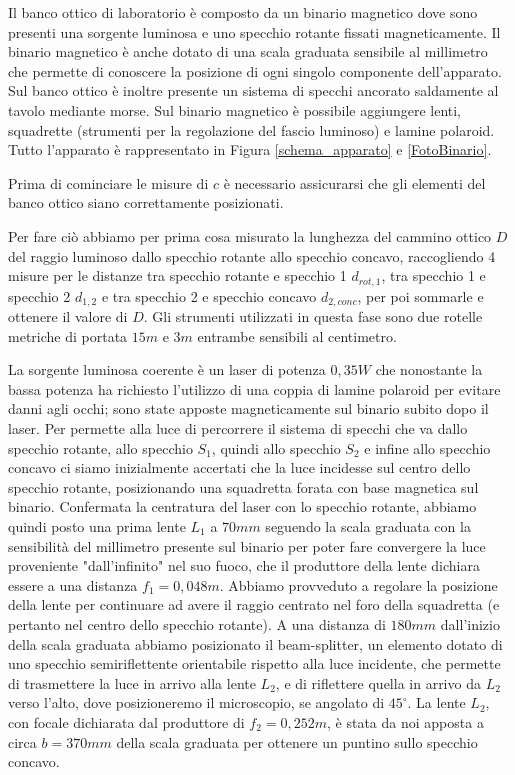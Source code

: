 \documentclass{article}
\begin{document}
Il banco ottico di laboratorio è composto da un binario magnetico dove sono presenti una sorgente luminosa e uno specchio rotante fissati magneticamente. Il binario magnetico
è anche dotato di una scala graduata sensibile al millimetro che permette di conoscere la posizione di ogni singolo componente dell'apparato. Sul banco ottico è inoltre 
presente un sistema di specchi ancorato saldamente al tavolo mediante morse. Sul binario magnetico è possibile aggiungere lenti, squadrette (strumenti per la 
regolazione del fascio luminoso) e lamine polaroid. Tutto l'apparato è rappresentato in Figura \ref{schema_apparato} e \ref{FotoBinario}.

Prima di cominciare le misure di $c$ è necessario assicurarsi che gli elementi del banco ottico siano correttamente posizionati.

\vspace{3mm}

Per fare ciò abbiamo per prima cosa misurato la lunghezza del cammino ottico $D$ del raggio luminoso dallo specchio rotante allo specchio concavo, raccogliendo 
4 misure per le distanze tra specchio rotante e specchio 1 $d_{rot,1}$, tra specchio 1 e specchio 2 $d_{1,2}$ e tra specchio 2 e specchio concavo $d_{2,conc}$, per poi 
sommarle e ottenere il valore di $D$. Gli strumenti utilizzati in questa fase sono due rotelle metriche di portata $15m$ e $3m$ entrambe sensibili al centimetro.

\vspace{3mm}
La sorgente luminosa coerente è un laser di potenza $0,35W$ che nonostante la bassa potenza ha richiesto l'utilizzo di una coppia di lamine polaroid per evitare danni agli
occhi; sono state apposte magneticamente sul binario subito dopo il laser.
Per permette alla luce di percorrere il sistema di specchi che va dallo specchio rotante, allo specchio $S_1$, quindi allo specchio $S_2$ e infine allo specchio concavo 
ci siamo inizialmente accertati che la luce incidesse sul centro dello specchio rotante, posizionando una squadretta forata con base magnetica sul binario.
Confermata la centratura del laser con lo specchio rotante, abbiamo quindi posto una prima lente $L_1$ a $70 mm$ seguendo la scala graduata con la sensibilità del 
millimetro presente sul binario per poter fare convergere la luce proveniente "dall'infinito" nel suo fuoco, che il produttore 
della lente dichiara essere a una distanza $f_1 = 0,048 m$. Abbiamo provveduto a regolare la posizione della lente per continuare ad avere il raggio centrato nel foro
della squadretta (e pertanto nel centro dello specchio rotante). A una distanza di $180mm$ dall'inizio della scala graduata abbiamo posizionato il beam-splitter, un elemento dotato di uno
specchio semiriflettente orientabile rispetto alla luce incidente, che permette di trasmettere la luce in arrivo alla lente $L_2$, e di riflettere quella in arrivo da 
$L_2$ verso l'alto, dove posizioneremo il microscopio, se angolato di $45^\circ$. La lente $L_2$, con focale dichiarata dal produttore di $f_2=0,252m$, è stata da noi 
apposta a circa $b = 370mm$ della scala graduata per ottenere un puntino sullo specchio concavo. 
\end{document}
